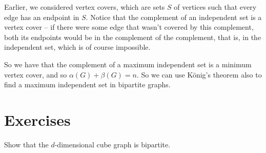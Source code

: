 \documentclass[nobib]{tufte-handout}
\begin{document}
\begin{remark}
    Earlier, we considered vertex covers, which are sets $S$ of vertices such that every edge has an endpoint in $S$. Notice that the complement of an independent set is a vertex cover -- if there were some edge that wasn't covered by this complement, both its endpoints would be in the complement of the complement, that is, in the independent set, which is of course impossible.

    So we have that the complement of a maximum independent set is a minimum vertex cover, and so $\alpha(G) + \beta(G) = n$. So we can use König's theorem also to find a maximum independent set in bipartite graphs.
\end{remark}
\section{Exercises}

\begin{xca}
    Show that the $d$-dimensional cube graph is bipartite.
\end{xca}


%
%
\end{document}
